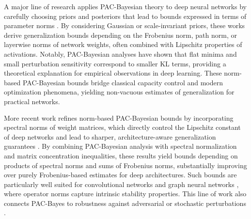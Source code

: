 \documentclass[journal]{IEEEtran} %
\begin{document}
%
A major line of research applies PAC-Bayesian theory to deep neural networks by carefully choosing priors and posteriors that lead to bounds expressed in terms of parameter norms \cite{neyshabur2015norm,neyshabur2018pac,dziugaite2017computing,bartlett2017spectrally}. By considering Gaussian or scale-invariant priors, these works derive generalization bounds depending on the Frobenius norm, path norm, or layerwise norms of network weights, often combined with Lipschitz properties of activations. Notably, PAC-Bayesian analyses have shown that flat minima and small perturbation sensitivity correspond to smaller KL terms, providing a theoretical explanation for empirical observations in deep learning. These norm-based PAC-Bayesian bounds bridge classical capacity control and modern optimization phenomena, yielding non-vacuous estimates of generalization for practical networks. 
%

%
More recent work refines norm-based PAC-Bayesian bounds by incorporating spectral norms of weight matrices, which directly control the Lipschitz constant of deep networks and lead to sharper, architecture-aware generalization guarantees \cite{neyshabur2018pac,zhou2018non,lotfi2022pac}. By combining PAC-Bayesian analysis with spectral normalization and matrix concentration inequalities, these results yield bounds depending on products of spectral norms and sums of Frobenius norms, substantially improving over purely Frobenius-based estimates for deep architectures. Such bounds are particularly well suited for convolutional networks and graph neural networks \cite{liao2020pac,ju2023generalization,brilliantov2024compositional}, where operator norms capture intrinsic stability properties. This line of work also connects PAC-Bayes to robustness against adversarial or stochastic perturbations \cite{xiao2023pac,jin2022enhancing,11027475}.
% 
\end{document}
